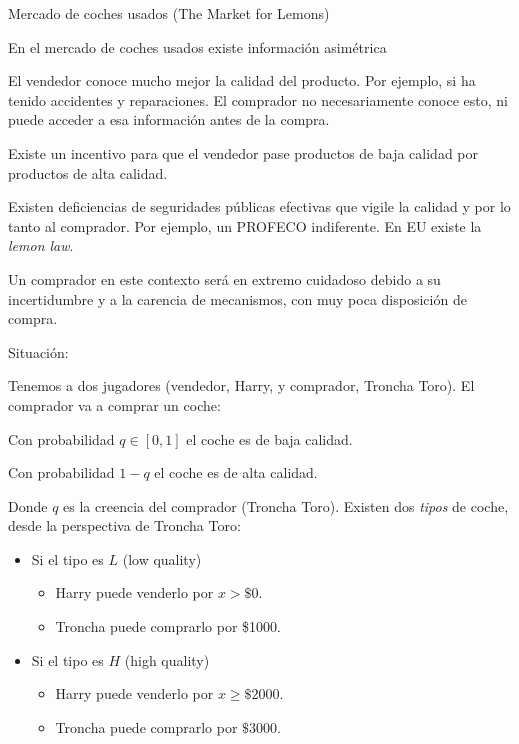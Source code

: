\documentclass[12pt]{article}
\begin{document}
\begin{exbox}{Mercado de coches usados (The Market for Lemons)}

	En el mercado de coches usados existe información asimétrica

	\begin{myitemize}
		\item El vendedor conoce mucho mejor la calidad del producto. Por ejemplo, si ha tenido accidentes y reparaciones. El comprador no necesariamente conoce esto, ni puede acceder a esa información antes de la compra.
		\item Existe un incentivo para que el vendedor pase productos de baja calidad por productos de alta calidad.
		\item Existen deficiencias de seguridades públicas efectivas que vigile la calidad y por lo tanto al comprador. Por ejemplo, un PROFECO indiferente. En EU existe la \textit{lemon law}.
	\end{myitemize}

	Un comprador en este contexto será en extremo cuidadoso debido a su incertidumbre y a la carencia de mecanismos, con muy poca disposición de compra.

	Situación:

	Tenemos a dos jugadores (vendedor, Harry, y comprador, Troncha Toro). El comprador va a comprar un coche:

	\begin{myitemize}
		\item Con probabilidad $q \in [0, 1]$ el coche es de baja calidad.
		\item Con probabilidad $1-q$ el coche es de alta calidad.
	\end{myitemize}

	Donde $q$ es la creencia del comprador (Troncha Toro). Existen dos \textit{tipos} de coche, desde la perspectiva de Troncha Toro:

	\begin{itemize}
		\item Si el tipo es $L$ (low quality)
		      \begin{itemize}
			      \item Harry puede venderlo por $x>\$0$.
			      \item Troncha puede comprarlo por \$1000.
		      \end{itemize}

	\end{itemize}

	\begin{itemize}
		\item Si el tipo es $H$ (high quality)
		      \begin{itemize}
			      \item Harry puede venderlo por $x\geq \$2000$.
			      \item Troncha puede comprarlo por $\$3000$.
		      \end{itemize}
	\end{itemize}


\end{exbox}
\end{document}

